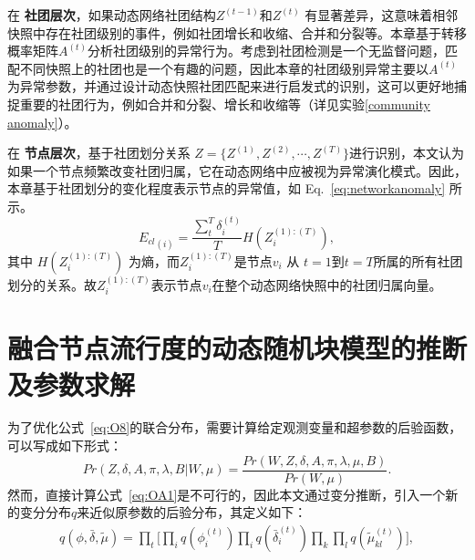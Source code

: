 在 \textbf{社团层次}，如果动态网络社团结构$Z^{(t-1)}$和$Z^{(t)}$ 有显著差异，这意味着相邻快照中存在社团级别的事件，例如社团增长和收缩、合并和分裂等。本章基于转移概率矩阵$A^{(t)}$分析社团级别的异常行为。考虑到社团检测是一个无监督问题，匹配不同快照上的社团也是一个有趣的问题，因此本章的社团级别异常主要以$A^{(t)}$为异常参数，并通过设计动态快照社团匹配来进行启发式的识别，这可以更好地捕捉重要的社团行为，例如合并和分裂、增长和收缩等（详见实验\ref{community anomaly}）。

在 \textbf{节点层次}，基于社团划分关系 $Z = \{ Z^{(1)}, Z^{(2)}, \cdots, Z^{(T)} \}$进行识别，本文认为如果一个节点频繁改变社团归属，它在动态网络中应被视为异常演化模式。因此，本章基于社团划分的变化程度表示节点的异常值，如 Eq.~\ref{eq:networkanomaly} 所示。
\begin{equation}
    {E_{cl}}_{(i)} = \frac{\sum_t^T \delta_i^{(t)}}{T} H(Z_i^{(1):(T)}),
\label{eq:networkanomaly}
\end{equation}
其中 $H(Z_i^{(1):(T)})$ 为熵，而$Z_i^{(1):(T)}$是节点$v_i$ 从 $t=1$到$t=T$所属的所有社团划分的关系。故$Z_i^{(1):(T)}$表示节点$v_i$在整个动态网络快照中的社团归属向量。


\section{融合节点流行度的动态随机块模型的推断及参数求解}
\label{sec4:inference}
为了优化公式~\ref{eq:O8}的联合分布，需要计算给定观测变量和超参数的后验函数，可以写成如下形式：
\begin{equation}
Pr(Z,\delta, A, \pi, \lambda, B | W, \mu) =
\frac{Pr(W, Z,\delta, A, \pi, \lambda, \mu, B)}{Pr( W, \mu)}.
\label{eq:OA1}
\end{equation}
然而，直接计算公式~\ref{eq:OA1}是不可行的，因此本文通过变分推断，引入一个新的变分分布$q$来近似原参数的后验分布，其定义如下：
\begin{equation}
\begin{split}
q(\phi,\bar{\delta}, \tilde{\mu}) = \prod_t \Big[ \prod_i q(\phi_i^{(t)}) \prod_i q(\bar{\delta}_i^{(t)}) \prod_k \prod_l q(\tilde{\mu}_{kl}^{(t)}) \Big],
\end{split}
\label{qfunc}
\end{equation}

